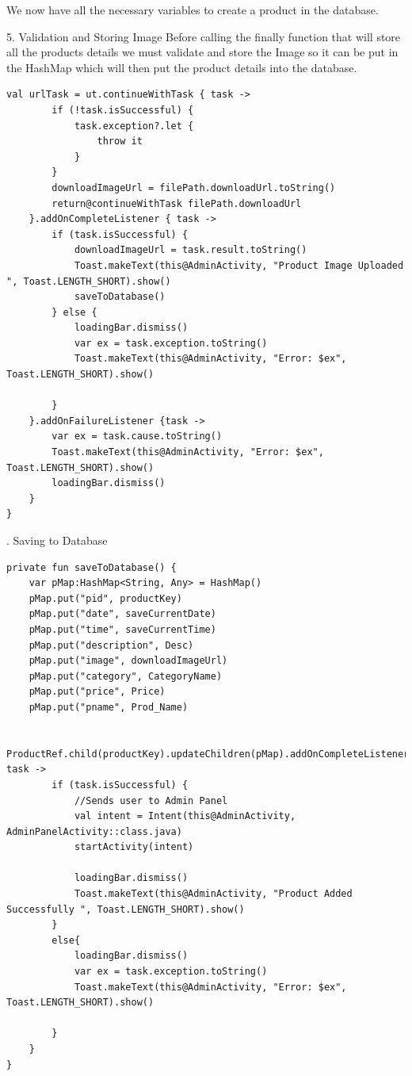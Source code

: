 We now have all the necessary variables to create a product in the database.\newline

5. Validation and Storing Image
Before calling the finally function that will store all the products details we must validate and store the Image so it can be put in the HashMap which will then put the product details into the database.

\begin{verbatim}
val urlTask = ut.continueWithTask { task ->
        if (!task.isSuccessful) {
            task.exception?.let {
                throw it
            }
        }
        downloadImageUrl = filePath.downloadUrl.toString()
        return@continueWithTask filePath.downloadUrl
    }.addOnCompleteListener { task ->
        if (task.isSuccessful) {
            downloadImageUrl = task.result.toString()
            Toast.makeText(this@AdminActivity, "Product Image Uploaded ", Toast.LENGTH_SHORT).show()
            saveToDatabase()
        } else {
            loadingBar.dismiss()
            var ex = task.exception.toString()
            Toast.makeText(this@AdminActivity, "Error: $ex", Toast.LENGTH_SHORT).show()

        }
    }.addOnFailureListener {task ->
        var ex = task.cause.toString()
        Toast.makeText(this@AdminActivity, "Error: $ex", Toast.LENGTH_SHORT).show()
        loadingBar.dismiss()
    }
}

\end{verbatim}
. Saving to Database
\begin{verbatim}
private fun saveToDatabase() {
    var pMap:HashMap<String, Any> = HashMap()
    pMap.put("pid", productKey)
    pMap.put("date", saveCurrentDate)
    pMap.put("time", saveCurrentTime)
    pMap.put("description", Desc)
    pMap.put("image", downloadImageUrl)
    pMap.put("category", CategoryName)
    pMap.put("price", Price)
    pMap.put("pname", Prod_Name)

    ProductRef.child(productKey).updateChildren(pMap).addOnCompleteListener{ task ->
        if (task.isSuccessful) {
            //Sends user to Admin Panel
            val intent = Intent(this@AdminActivity, AdminPanelActivity::class.java)
            startActivity(intent)

            loadingBar.dismiss()
            Toast.makeText(this@AdminActivity, "Product Added Successfully ", Toast.LENGTH_SHORT).show()
        }
        else{
            loadingBar.dismiss()
            var ex = task.exception.toString()
            Toast.makeText(this@AdminActivity, "Error: $ex", Toast.LENGTH_SHORT).show()

        }
    }
}

\end{verbatim}

